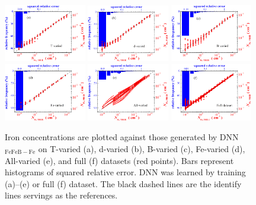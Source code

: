 \documentclass[num-refs]{wiley-article} %
\begin{document}
\begin{figure}[bt]
\centering
\includegraphics[width=0.32\textwidth]{Fig8a}
\includegraphics[width=0.32\textwidth]{Fig8b}
\includegraphics[width=0.32\textwidth]{Fig8c}
\includegraphics[width=0.32\textwidth]{Fig8d}
\includegraphics[width=0.32\textwidth]{Fig8e}
\includegraphics[width=0.32\textwidth]{Fig8f}
\caption{Iron concentrations are plotted against those generated by DNN$_\mathrm{FeFeB-Fe}$
on  T-varied (a),
d-varied (b),
B-varied (c),
Fe-varied (d),
All-varied (e),
and full (f) datasets (red points).
Bars represent histograms of squared relative error.
DNN was learned by training (a)--(e) or full (f) dataset.
The black dashed lines are the identify lines servings as the references.}
\label{fig_TrDNN2}
\end{figure}
\end{document}
